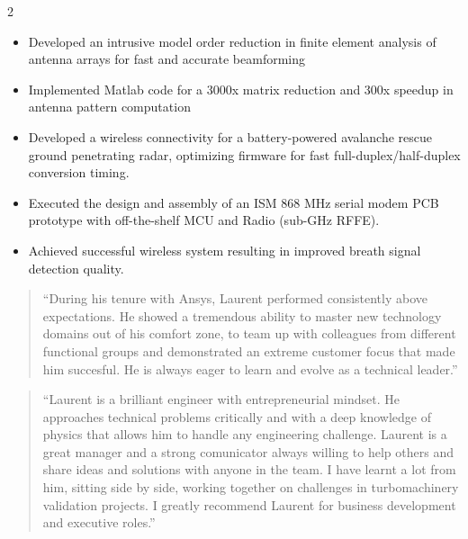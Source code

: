 \documentclass[9pt,a4paper,ragged2e,withhyper]{altacv} %
\begin{document}
\begin{paracol}{2}
\begin{itemize}
\item Developed an intrusive model order reduction in finite element analysis of antenna arrays for fast and accurate beamforming
\item Implemented Matlab code for a 3000x matrix reduction and 300x speedup in antenna pattern computation
\end{itemize}
\divider

\begin{itemize}
\item Developed a wireless connectivity for a battery-powered avalanche rescue ground penetrating radar, optimizing firmware for fast full-duplex/half-duplex conversion timing.
\item Executed the design and assembly of an ISM 868 MHz serial modem PCB prototype with off-the-shelf MCU and Radio (sub-GHz RFFE).
\item Achieved successful wireless system resulting in improved breath signal detection quality.
\end{itemize}



\begin{quotation}
    ``During his tenure with Ansys, Laurent performed consistently above expectations. He showed a tremendous ability to master new technology domains out of his comfort zone, to team up with colleagues from different functional groups and demonstrated an extreme customer focus that made him succesful. He is always eager to learn and evolve as a technical leader.''
\end{quotation}

\medskip

\begin{quotation}
  ``Laurent is a brilliant engineer with entrepreneurial mindset. He approaches technical problems critically and with a deep knowledge of physics that allows him to handle any engineering challenge. Laurent is a great manager and a strong comunicator always willing to help others and share ideas and solutions with anyone in the team. I have learnt a lot from him, sitting side by side, working together on challenges in turbomachinery validation projects. I greatly recommend Laurent for business development and executive roles.''
\end{quotation}



\end{paracol}
\end{document}
